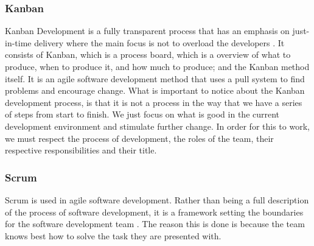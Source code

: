 \subsubsection{Kanban}
Kanban Development is a fully transparent process that has an emphasis on just-in-time delivery where the main focus is not to overload the developers \cite{bib:kanban}. It consists of Kanban, which is a process board, which is a overview of what to produce, when to produce it, and how much to produce; and the Kanban method itself. It is an agile software development method that uses a pull system to find problems and encourage change.  What is important to notice about the Kanban development process, is that it is not a process in the way that we have a series of steps from start to finish. We just focus on what is good in the current development environment and stimulate further change. In order for this to work, we must respect the  process of development, the roles of the team, their respective responsibilities and their title.

\subsubsection{Scrum}
Scrum is used in agile software development. Rather than being a full description of the process of software development, it is a framework setting the boundaries for the software development team \cite{bib:asdas}. The reason this is done is because the team knows best how to solve the task they are presented with.

\newpage


